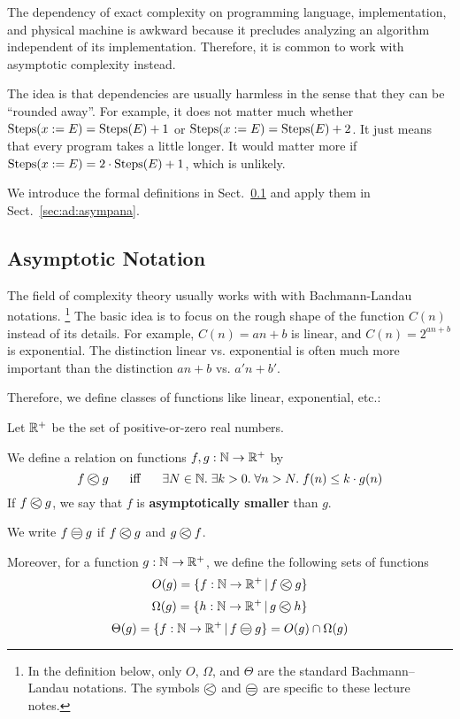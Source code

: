 The dependency of exact complexity on programming language, implementation, and physical machine is awkward because it precludes analyzing an algorithm independent of its implementation.
Therefore, it is common to work with asymptotic complexity instead.

The idea is that dependencies are usually harmless in the sense that they can be ``rounded away''.
For example, it does not matter much whether $\mathrm{Steps}(x:=E)=\mathrm{Steps}(E)+1$ or $\mathrm{Steps}(x:=E)=\mathrm{Steps}(E)+2$.
It just means that every program takes a little longer.
It would matter more if $\mathrm{Steps}(x:=E)=2\cdot\mathrm{Steps}(E)+1$, which is unlikely.

We introduce the formal definitions in Sect.~\ref{sec:ad:onot} and apply them in Sect.~\ref{sec:ad:asympana}.

\subsection{Asymptotic Notation}\label{sec:ad:onot}

The field of complexity theory usually works with with Bachmann-Landau notations.%
\footnote{In the definition below, only $O$, $\Omega$, and $\Theta$ are the standard Bachmann–Landau notations. The symbols $\Oleq{}{}$ and $\Oeq{}{}$ are specific to these lecture notes.}
The basic idea is to focus on the rough shape of the function $C(n)$ instead of its details.
For example, $C(n)=an+b$ is linear, and $C(n)=2^{an+b}$ is exponential.
The distinction linear vs. exponential is often much more important than the distinction $an+b$ vs. $a'n+b'$. 

Therefore, we define classes of functions like linear, exponential, etc.:

\begin{definition}[O-Notation]\label{def:ad:onot}
Let $\mathbb{R}^+$ be the set of positive-or-zero real numbers.

We define a relation on functions $f,g:\mathbb{N}\to\mathbb{R}^+$ by
\[\Oleq{f}{g} \tb\miff\tb \exists N\in\N.\;\exists k>0.\;  \forall n>N.\; f(n)\leq k\cdot g(n)\]
If $\Oleq{f}{g}$, we say that $f$ is \textbf{asymptotically smaller} than $g$.

We write $\Oeq{f}{g}$ if $\Oleq{f}{g}$ and $\Oleq{g}{f}$.

Moreover, for a function $g:\mathbb{N}\to\mathbb{R}^+$, we define the following sets of functions
\[O(g) = \{f:\N\to\R^+\,|\, \Oleq{f}{g}\}\]
\[\Omega(g) = \{h:\N\to\R^+\,|\, \Oleq{g}{h}\}\]
\[\Theta(g) = \{f:\N\to\R^+\,|\, \Oeq{f}{g} \} = O(g)\cap\Omega(g)\]
\end{definition}

